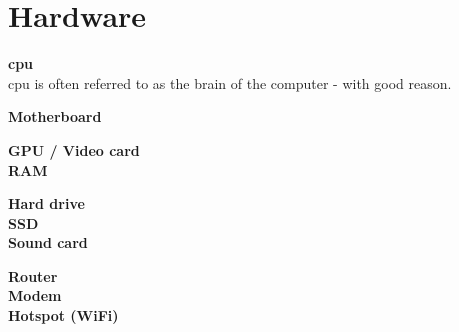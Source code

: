 \section{Hardware}

\textbf{\acrfull{cpu}} \\
\acrfull{cpu} is often referred to as the brain of the computer - with good reason. 

\textbf{Motherboard}

\textbf{GPU / Video card} \\

\textbf{RAM}

\textbf{Hard drive} \\

\textbf{SSD} \\

\textbf{Sound card}

\textbf{Router} \\

\textbf{Modem} \\

\textbf{Hotspot (WiFi)} \\




\newpage